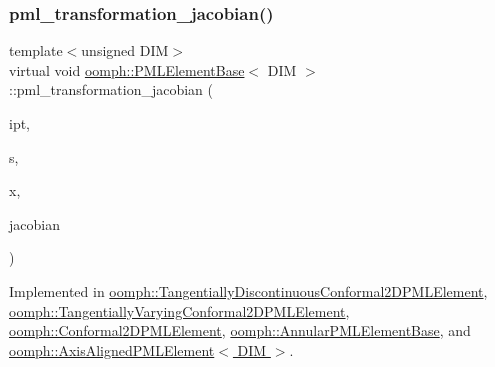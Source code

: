 \subsubsection{\texorpdfstring{pml\+\_\+transformation\+\_\+jacobian()}{pml\_transformation\_jacobian()}\hspace{0.1cm}{\footnotesize\ttfamily [1/2]}}
{\footnotesize\ttfamily template$<$unsigned D\+IM$>$ \\
virtual void \hyperlink{classoomph_1_1PMLElementBase}{oomph\+::\+P\+M\+L\+Element\+Base}$<$ D\+IM $>$\+::pml\+\_\+transformation\+\_\+jacobian (\begin{DoxyParamCaption}\item[{const unsigned \&}]{ipt,  }\item[{const \hyperlink{classoomph_1_1Vector}{Vector}$<$ double $>$ \&}]{s,  }\item[{const \hyperlink{classoomph_1_1Vector}{Vector}$<$ double $>$ \&}]{x,  }\item[{\hyperlink{classoomph_1_1DenseComplexMatrix}{Dense\+Complex\+Matrix} \&}]{jacobian }\end{DoxyParamCaption})\hspace{0.3cm}{\ttfamily [pure virtual]}}



Implemented in \hyperlink{classoomph_1_1TangentiallyDiscontinuousConformal2DPMLElement_a906b78ba975b45dd3702ee8b42dc68cd}{oomph\+::\+Tangentially\+Discontinuous\+Conformal2\+D\+P\+M\+L\+Element}, \hyperlink{classoomph_1_1TangentiallyVaryingConformal2DPMLElement_adcd024767abae57059b87fa19b1d489c}{oomph\+::\+Tangentially\+Varying\+Conformal2\+D\+P\+M\+L\+Element}, \hyperlink{classoomph_1_1Conformal2DPMLElement_ae30e06af48dbb74be0fc64173c8fbb63}{oomph\+::\+Conformal2\+D\+P\+M\+L\+Element}, \hyperlink{classoomph_1_1AnnularPMLElementBase_a2f79efade3e4be24515b2960f447e10e}{oomph\+::\+Annular\+P\+M\+L\+Element\+Base}, and \hyperlink{classoomph_1_1AxisAlignedPMLElement_a9fba3c6d10af49f64833ecfe97b730c5}{oomph\+::\+Axis\+Aligned\+P\+M\+L\+Element$<$ D\+I\+M $>$}.

\mbox{\label{classoomph_1_1PMLElementBase_a4b9d6d74aa15e6395590b27686477b20}} 
